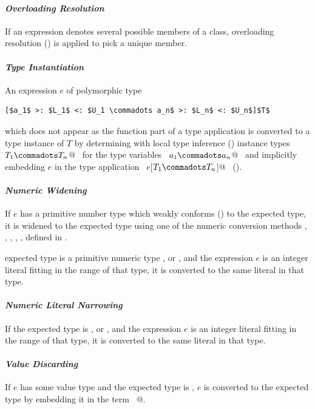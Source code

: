 \paragraph{\em Overloading Resolution} 
If an expression denotes several possible members of a class, 
overloading resolution ()
is applied to pick a unique member.

\paragraph{\em Type Instantiation}  
An expression $e$ of polymorphic type
\begin{lstlisting}
[$a_1$ >: $L_1$ <: $U_1 \commadots a_n$ >: $L_n$ <: $U_n$]$T$
\end{lstlisting}
which does not appear as the function part of
a type application is converted to a type instance of $T$
by determining with local type inference
() instance types ~\lstinline@$T_1 \commadots T_n$@~ 
for the type variables ~\lstinline@$a_1 \commadots a_n$@~ and
implicitly embedding $e$ in the type application
~\lstinline@$e$[$T_1 \commadots T_n$]@~ ().

\paragraph{\em Numeric Widening}
If $e$ has a primitive number type which weakly conforms
() to the expected type, it is widened to
the expected type using one of the numeric conversion methods
, , , ,
,  defined in .

expected type is a primitive numeric type
,  or , and
the expression $e$ is an integer literal fitting in the range of that
type, it is converted to the same literal in that type.

\paragraph{\em Numeric Literal Narrowing}
If the expected type is ,  or , and
the expression $e$ is an integer literal fitting in the range of that
type, it is converted to the same literal in that type.

\paragraph{\em Value Discarding}
If $e$ has some value type and the expected type is ,
$e$ is converted to the expected type by embedding it in the 
term ~@.

